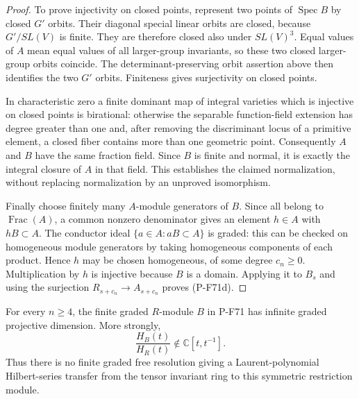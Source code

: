 \begin{proof}
To prove injectivity on closed points, represent two
points of $\operatorname{Spec}B$ by closed $G'$ orbits.
Their diagonal special linear orbits are closed, because
$G'/SL(V)$ is finite.  They are therefore closed also
under $SL(V)^3$.  Equal values of $A$ mean equal values
of all larger-group invariants, so these two closed
larger-group orbits coincide.  The determinant-preserving
orbit assertion above then identifies the two $G'$
orbits.  Finiteness gives surjectivity on closed points.

In characteristic zero a finite dominant map of integral
varieties which is injective on closed points is birational:
otherwise the separable function-field extension has
degree greater than one and, after removing the
discriminant locus of a primitive element, a closed
fiber contains more than one geometric point.
Consequently $A$ and $B$ have the same fraction field.
Since $B$ is finite and normal, it is exactly the integral
closure of $A$ in that field.  This establishes the
claimed normalization, without replacing normalization
by an unproved isomorphism.

Finally choose finitely many $A$-module generators of
$B$.  Since all belong to $\operatorname{Frac}(A)$,
a common nonzero denominator gives an element
$h\in A$ with $hB\subset A$.  The conductor ideal
$\{a\in A:aB\subset A\}$ is graded: this can be checked
on homogeneous module generators by taking homogeneous
components of each product.  Hence $h$ may be chosen
homogeneous, of some degree $c_n\ge0$.  Multiplication
by $h$ is injective because $B$ is a domain.  Applying
it to $B_s$ and using the surjection
$R_{s+c_n}\to A_{s+c_n}$ proves (P-F71d).
\end{proof}

\begin{corollary}
For every $n\ge4$, the finite graded $R$-module $B$
in P-F71 has infinite graded projective dimension.
More strongly,
\[
                         \frac{H_B(t)}{H_R(t)}
                    \notin\mathbb C[t,t^{-1}].                \tag{P-F71g}
\]
Thus there is no finite graded free resolution giving
a Laurent-polynomial Hilbert-series transfer from the
tensor invariant ring to this symmetric restriction module.
\end{corollary}

